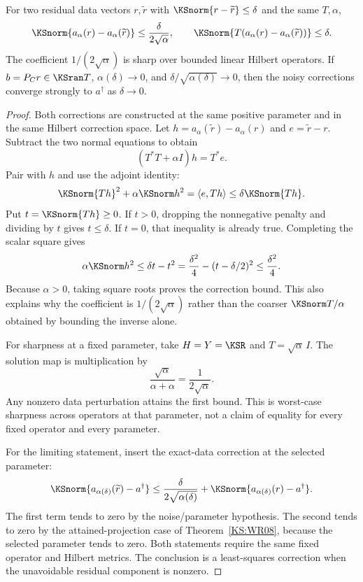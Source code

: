 \begin{KStheorem}\label{KS:WR09}
For two residual data vectors $r,\widetilde r$ with $\KSnorm{r-\widetilde r}\le\delta$ and the same $T,\alpha$,
\[
 \KSnorm{a_\alpha(r)-a_\alpha(\widetilde r)}
 \le\frac{\delta}{2\sqrt\alpha},\qquad
 \KSnorm{T(a_\alpha(r)-a_\alpha(\widetilde r))}\le\delta.
\]
The coefficient $1/(2\sqrt\alpha)$ is sharp over bounded linear Hilbert operators. If $b=P_Cr\in\KSran T$, $\alpha(\delta)\to0$, and $\delta/\sqrt{\alpha(\delta)}\to0$, then the noisy corrections converge strongly to $a^\dagger$ as $\delta\to0$.
\end{KStheorem}
\begin{proof}
Both corrections are constructed at the same positive parameter and in the same Hilbert correction space. Let $h=a_\alpha(\widetilde r)-a_\alpha(r)$ and $e=\widetilde r-r$. Subtract the two normal equations to obtain
\[
 (T^*T+\alpha I)h=T^*e.
\]
Pair with $h$ and use the adjoint identity:
\[
 \KSnorm{Th}^2+\alpha\KSnorm h^2
 =\langle e,Th\rangle\le\delta\KSnorm{Th}.
\]
Put $t=\KSnorm{Th}\ge0$. If $t>0$, dropping the nonnegative penalty and dividing by $t$ gives $t\le\delta$. If $t=0$, that inequality is already true. Completing the scalar square gives
\[
 \alpha\KSnorm h^2\le\delta t-t^2
 =\frac{\delta^2}{4}-(t-\delta/2)^2
 \le\frac{\delta^2}{4}.
\]
Because $\alpha>0$, taking square roots proves the correction bound. This also explains why the coefficient is $1/(2\sqrt\alpha)$ rather than the coarser $\KSnorm T/\alpha$ obtained by bounding the inverse alone.

For sharpness at a fixed parameter, take $H=Y=\KSR$ and $T=\sqrt\alpha\,I$. The solution map is multiplication by
\[
 \frac{\sqrt\alpha}{\alpha+\alpha}=\frac1{2\sqrt\alpha}.
\]
Any nonzero data perturbation attains the first bound. This is worst-case sharpness across operators at that parameter, not a claim of equality for every fixed operator and every parameter.

For the limiting statement, insert the exact-data correction at the selected parameter:
\[
 \KSnorm{a_{\alpha(\delta)}(\widetilde r)-a^\dagger}
 \le\frac{\delta}{2\sqrt{\alpha(\delta)}}
       +\KSnorm{a_{\alpha(\delta)}(r)-a^\dagger}.
\]
The first term tends to zero by the noise/parameter hypothesis. The second tends to zero by the attained-projection case of Theorem~\ref{KS:WR08}, because the selected parameter tends to zero. Both statements require the same fixed operator and Hilbert metrics. The conclusion is a least-squares correction when the unavoidable residual component is nonzero.
\end{proof}

